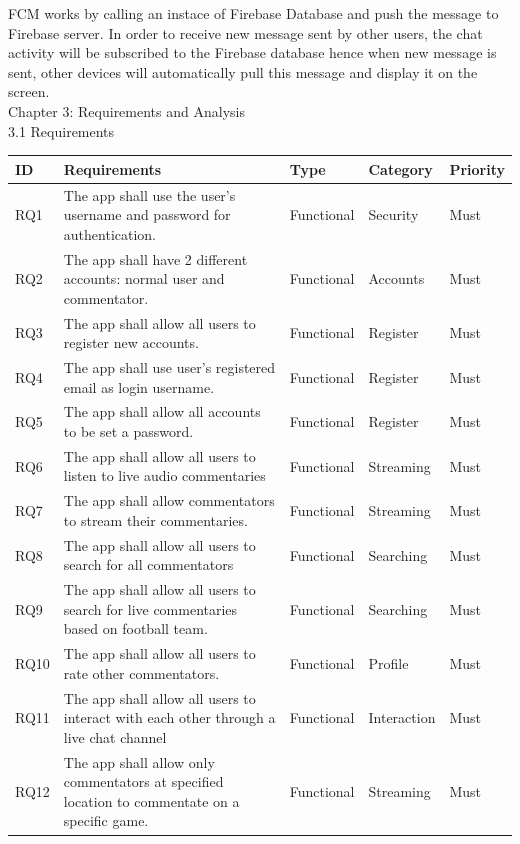 \documentclass{article}
\begin{document}
\begin{flushleft}
FCM works by calling an instace of Firebase Database and push the message to Firebase server. In order to receive new message sent by other users, the chat activity will be subscribed to the Firebase database hence when new message is sent, other devices will automatically pull this message and display it on the screen.\\
{\huge Chapter 3: Requirements and Analysis}\\
{\Large 3.1 Requirements}\\
\begin{tabular}[t]{| p{1cm} | p{6cm} | p{1.8cm} | p{2cm} | p{1.2cm} |}
\hline
ID & Requirements & Type & Category & Priority \\
\hline
RQ1 & The app shall use the user's username and password for authentication. & Functional & Security & Must\\
\hline
RQ2 & The app shall have 2 different accounts: normal user and commentator. & Functional & Accounts & Must\\
\hline
RQ3 & The app shall allow all users to register new accounts. & Functional & Register & Must\\
\hline
RQ4 & The app shall use user's registered email as login username. & Functional & Register & Must\\
\hline
RQ5 & The app shall allow all accounts to be set a password. & Functional & Register & Must\\
\hline
RQ6 & The app shall allow all users to listen to live audio commentaries & Functional & Streaming & Must\\
\hline
RQ7 & The app shall allow commentators to stream their commentaries. & Functional & Streaming & Must\\
\hline
RQ8 & The app shall allow all users to search for all commentators & Functional & Searching & Must\\
\hline
RQ9 & The app shall allow all users to search for live commentaries based on football team. & Functional & Searching & Must\\
\hline
RQ10 & The app shall allow all users to rate other commentators. & Functional & Profile & Must\\
\hline
RQ11 & The app shall allow all users to interact with each other through a live chat channel & Functional & Interaction & Must\\
\hline
RQ12 & The app shall allow only commentators at specified location to commentate on a specific game. & Functional & Streaming & Must\\
\hline

\end{tabular}
\end{flushleft}
\end{document}
